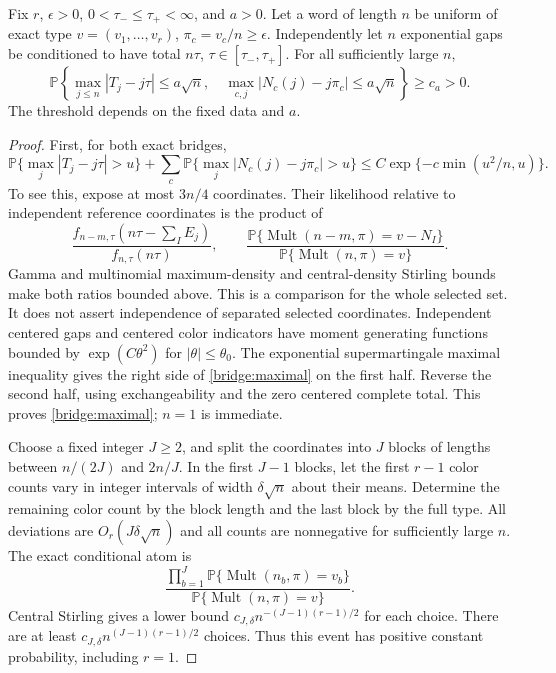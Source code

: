 \begin{lemma}\label{bridge:small-tube}
Fix $r$, $\epsilon>0$, $0<\tau_-\le\tau_+<\infty$, and $a>0$.
Let a word of length $n$ be uniform of exact type
$v=(v_1,\ldots,v_r)$, $\pi_c=v_c/n\ge\epsilon$. Independently let
$n$ exponential gaps be conditioned to have total $n\tau$,
$\tau\in[\tau_-,\tau_+]$. For all sufficiently large $n$,
\[
 \mathbb P\left\{
 \max_{j\le n}|T_j-j\tau|\le a\sqrt n,
 \quad\max_{c,j}|N_c(j)-j\pi_c|\le a\sqrt n
 \right\}\ge c_a>0.
\]
The threshold depends on the fixed data and $a$.
\end{lemma}
\begin{proof}
First, for both exact bridges,
\begin{equation}
 \mathbb P\{\max_j|T_j-j\tau|>u\}
 +\sum_c\mathbb P\{\max_j|N_c(j)-j\pi_c|>u\}
 \le C\exp\{-c\min(u^2/n,u)\}.\label{bridge:maximal}
\end{equation}
To see this, expose at most $3n/4$ coordinates. Their likelihood
relative to independent reference coordinates is the product of
\[
 \frac{f_{n-m,\tau}(n\tau-\sum_I E_j)}{f_{n,\tau}(n\tau)},
 \qquad
 \frac{\mathbb P\{\operatorname{Mult}(n-m,\pi)=v-N_I\}}
      {\mathbb P\{\operatorname{Mult}(n,\pi)=v\}}.
\]
Gamma and multinomial maximum-density and central-density Stirling
bounds make both ratios bounded above. This is a comparison for the
whole selected set. It does not assert independence of separated
selected coordinates. Independent centered gaps and centered color
indicators have moment generating functions bounded by
$\exp(C\theta^2)$ for $|\theta|\le\theta_0$. The exponential
supermartingale maximal inequality gives the right side of
\eqref{bridge:maximal} on the first half. Reverse the second half,
using exchangeability and the zero centered complete total. This
proves \eqref{bridge:maximal}; $n=1$ is immediate.

Choose a fixed integer $J\ge2$, and split the coordinates into $J$
blocks of lengths between $n/(2J)$ and $2n/J$. In the first $J-1$
blocks, let the first $r-1$ color counts vary in integer intervals of
width $\delta\sqrt n$ about their means. Determine the remaining
color count by the block length and the last block by the full type.
All deviations are $O_r(J\delta\sqrt n)$ and all counts are
nonnegative for sufficiently large $n$. The exact conditional atom is
\[
 \frac{\prod_{b=1}^J
       \mathbb P\{\operatorname{Mult}(n_b,\pi)=v_b\}}
      {\mathbb P\{\operatorname{Mult}(n,\pi)=v\}}.
\]
Central Stirling gives a lower bound
$c_{J,\delta}n^{-(J-1)(r-1)/2}$ for each choice. There are at least
$c_{J,\delta}n^{(J-1)(r-1)/2}$ choices. Thus this event has positive
constant probability, including $r=1$.


\end{proof}
